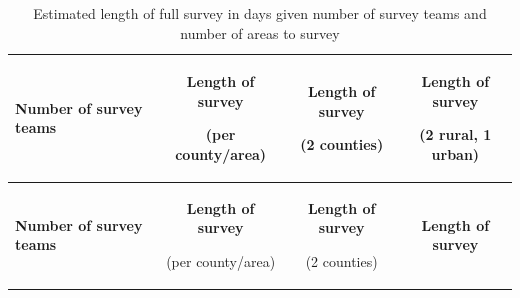 \documentclass[12pt,a4paper]{book}
\theoremstyle{definition}
\theoremstyle{definition}
\theoremstyle{definition}
\theoremstyle{remark}
\begin{document}
\begin{longtable}[]{@{}lccc@{}}
\caption{\label{tab:surveydays} Estimated length of full survey in days
given number of survey teams and number of areas to
survey}\tabularnewline
\toprule
\begin{minipage}[b]{0.24\columnwidth}\raggedright
\textbf{Number of survey teams}\strut
\end{minipage} & \begin{minipage}[b]{0.24\columnwidth}\centering
\textbf{Length of survey}

(per county/area)\strut
\end{minipage} & \begin{minipage}[b]{0.24\columnwidth}\centering
\textbf{Length of survey}

(2 counties)\strut
\end{minipage} & \begin{minipage}[b]{0.24\columnwidth}\centering
\textbf{Length of survey}

(2 rural, 1 urban)\strut
\end{minipage}\tabularnewline
\midrule
\endfirsthead
\toprule
\begin{minipage}[b]{0.24\columnwidth}\raggedright
\textbf{Number of survey teams}\strut
\end{minipage} & \begin{minipage}[b]{0.24\columnwidth}\centering
\textbf{Length of survey}

(per county/area)\strut
\end{minipage} & \begin{minipage}[b]{0.24\columnwidth}\centering
\textbf{Length of survey}

(2 counties)\strut
\end{minipage} & \begin{minipage}[b]{0.24\columnwidth}\centering
\textbf{Length of survey}


\end{minipage}
\end{longtable}
\end{document}
